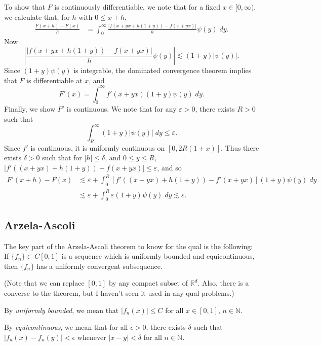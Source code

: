 \documentclass[answers]{exam}
\theoremstyle{problemstyle}
\newcommand{\1}[1]{\textbf{1}_{\left[#1\right]}} %
\def\R{\mathbb{R}} %
\begin{document}
\begin{questions}
\begin{solution}
    To show that $F$ is continuously differentiable, we note that for a fixed $x \in [0,\infty)$, we calculate that, for $h$ with $0 \leq x + h$,
    \begin{align*}
        \frac{F(x+h) - F(x)}{h} &= \int_0^\infty \frac{|f(x+yx + h(1 + y)) - f(x + yx)|}{h} \psi(y)\; dy.
    \end{align*}
    Now
    \[ \left| \frac{|f(x+yx + h(1 + y)) - f(x + yx)|}{h} \psi(y) \right| \lesssim (1 + y) |\psi(y)|. \]
    Since $(1 + y) \psi(y)$ is integrable, the dominated convergence theorem implies that $F$ is differentiable at $x$, and
    \[ F'(x) = \int_0^\infty f'(x + yx) (1 + y) \psi(y)\; dy. \]
    Finally, we show $F'$ is continuous. We note that for any $\varepsilon > 0$, there exists $R > 0$ such that
    \[ \int_R^\infty (1 + y) |\psi(y)|\; dy \leq \varepsilon. \]
    Since $f'$ is continuous, it is uniformly continuous on $[0,2R(1 + x)]$. Thus there exists $\delta > 0$ such that for $|h| \leq \delta$, and $0 \leq y \leq R$, $|f'((x + yx) + h(1 + y)) - f(x + yx)| \leq \varepsilon$, and so
    \begin{align*}
        F'(x+h) - F(x) &\lesssim \varepsilon + \int_0^R [f'((x + yx) + h(1 + y)) - f'(x + yx)] (1 + y) \psi(y)\; dy\\
        &\lesssim \varepsilon + \int_0^R \varepsilon (1 + y) \psi(y)\; dy \lesssim \varepsilon.
    \end{align*}
\end{solution}

\subsection{Arzela-Ascoli}


The key part of the Arzela-Ascoli theorem to know for the qual is the following: If $\{f_n\}\subset C[0,1]$ is a sequence which is uniformly bounded and equicontinuous, then $\{f_n\}$ has a uniformly convergent subsequence. 

(Note that we can replace $[0,1]$ by any compact subset of $\R^d$. Also, there is a converse to the theorem, but I haven't seen it used in any qual problems.)

By \textit{uniformly bounded}, we mean that $|f_n(x)|\leq C$ for all $x\in [0,1]$, $n\in \mathbb{N}$.

By \textit{equicontinuous}, we mean that for all $\epsilon>0$, there exists $\delta$ such that  $|f_n(x)-f_n(y)|<\epsilon$ whenever $|x-y|<\delta$ for all $n\in \mathbb{N}$.



\end{questions}
\end{document}
